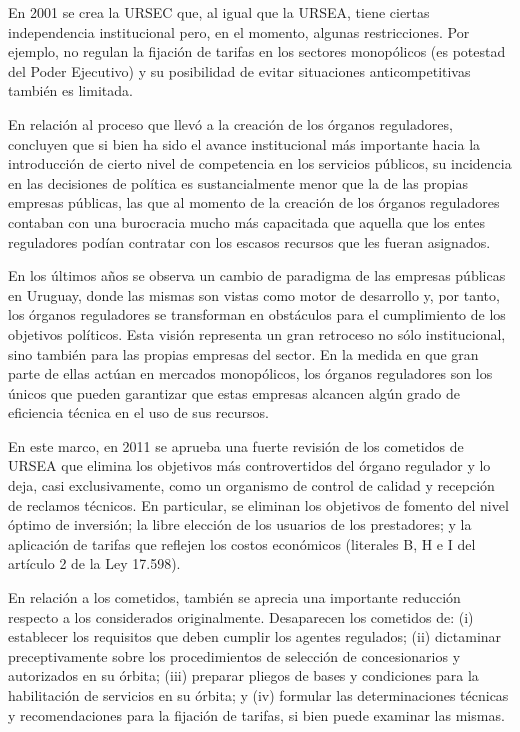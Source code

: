 \documentclass[
  12pt,
  spanish,
]{book}
\begin{document}
En 2001 se crea la URSEC que, al igual que la URSEA, tiene ciertas independencia institucional pero, en el momento, algunas restricciones. Por ejemplo, no regulan la fijación de tarifas en los sectores monopólicos (es potestad del Poder Ejecutivo) y su posibilidad de evitar situaciones anticompetitivas también es limitada.

En relación al proceso que llevó a la creación de los órganos reguladores, \citet{Bergara2005} concluyen que si bien ha sido el avance institucional más importante hacia la introducción de cierto nivel de competencia en los servicios públicos, su incidencia en las decisiones de política es sustancialmente menor que la de las propias empresas públicas, las que al momento de la creación de los órganos reguladores contaban con una burocracia mucho más capacitada que aquella que los entes reguladores podían contratar con los escasos recursos que les fueran asignados.

En los últimos años se observa un cambio de paradigma de las empresas públicas en Uruguay, donde las mismas son vistas como motor de desarrollo y, por tanto, los órganos reguladores se transforman en obstáculos para el cumplimiento de los objetivos políticos. Esta visión representa un gran retroceso no sólo institucional, sino también para las propias empresas del sector. En la medida en que gran parte de ellas actúan en mercados monopólicos, los órganos reguladores son los únicos que pueden garantizar que estas empresas alcancen algún grado de eficiencia técnica en el uso de sus recursos.

En este marco, en 2011 se aprueba una fuerte revisión de los cometidos de URSEA que elimina los objetivos más controvertidos del órgano regulador y lo deja, casi exclusivamente, como un organismo de control de calidad y recepción de reclamos técnicos. En particular, se eliminan los objetivos de fomento del nivel óptimo de inversión; la libre elección de los usuarios de los prestadores; y la aplicación de tarifas que reflejen los costos económicos (literales B, H e I del artículo 2 de la Ley 17.598).

En relación a los cometidos, también se aprecia una importante reducción respecto a los considerados originalmente. Desaparecen los cometidos de: (i) establecer los requisitos que deben cumplir los agentes regulados; (ii) dictaminar preceptivamente sobre los procedimientos de selección de concesionarios y autorizados en su órbita; (iii) preparar pliegos de bases y condiciones para la habilitación de servicios en su órbita; y (iv) formular las determinaciones técnicas y recomendaciones para la fijación de tarifas, si bien puede examinar las mismas.
\end{document}
